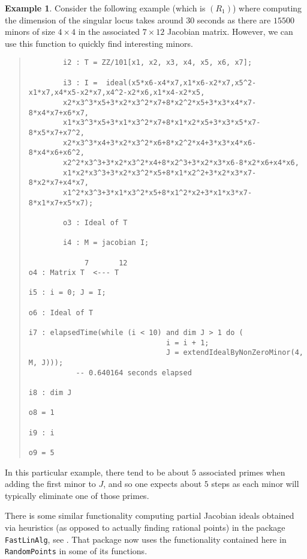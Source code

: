 \documentclass[11pt]{amsart}
\theoremstyle{definition}
\newtheorem{example}{Example}[section]
\begin{document}
\begin{example}
    Consider the following example (which is $(R_1)$) where computing the dimension of the singular locus takes around $30$ seconds as there are $15500$ minors of size $4 \times 4$ in the associated $7 \times 12$ Jacobian matrix.  However, we can use this function to quickly find interesting minors.
  {{\small\color{blue}
  \begin{quote}
\begin{verbatim}
		i2 : T = ZZ/101[x1, x2, x3, x4, x5, x6, x7];
		
		i3 : I =  ideal(x5*x6-x4*x7,x1*x6-x2*x7,x5^2-x1*x7,x4*x5-x2*x7,x4^2-x2*x6,x1*x4-x2*x5,
		x2*x3^3*x5+3*x2*x3^2*x7+8*x2^2*x5+3*x3*x4*x7-8*x4*x7+x6*x7,
		x1*x3^3*x5+3*x1*x3^2*x7+8*x1*x2*x5+3*x3*x5*x7-8*x5*x7+x7^2,
		x2*x3^3*x4+3*x2*x3^2*x6+8*x2^2*x4+3*x3*x4*x6-8*x4*x6+x6^2,
		x2^2*x3^3+3*x2*x3^2*x4+8*x2^3+3*x2*x3*x6-8*x2*x6+x4*x6,
		x1*x2*x3^3+3*x2*x3^2*x5+8*x1*x2^2+3*x2*x3*x7-8*x2*x7+x4*x7,
		x1^2*x3^3+3*x1*x3^2*x5+8*x1^2*x2+3*x1*x3*x7-8*x1*x7+x5*x7);
		
		o3 : Ideal of T
		
		i4 : M = jacobian I;

             7       12
o4 : Matrix T  <--- T          

i5 : i = 0; J = I;

o6 : Ideal of T

i7 : elapsedTime(while (i < 10) and dim J > 1 do (
                                i = i + 1;                       
                                J = extendIdealByNonZeroMinor(4, M, J)));
           -- 0.640164 seconds elapsed        

i8 : dim J

o8 = 1

i9 : i

o9 = 5
\end{verbatim}
\end{quote}
    }}    
    \noindent
    In this particular example, there tend to be about $5$ associated primes when adding the first minor to $J$, and so one expects about $5$ steps as each minor will typically eliminate one of those primes.
\end{example} 

There is some similar functionality computing partial Jacobian ideals obtained via heuristics (as opposed to actually finding rational points) in the package {\tt FastLinAlg}, see \cite{FastLinAlgSource}.  That package now uses the functionality contained here in {\tt RandomPoints} in some of its functions.




\end{document}
